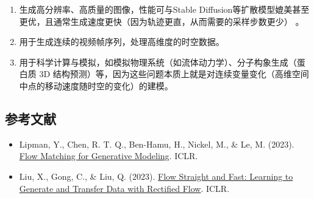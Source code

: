 \begin{enumerate}
\def\labelenumi{\arabic{enumi}.}
\item
  生成高分辨率、高质量的图像，性能可与Stable Diffusion等扩散模型媲美甚至更优，且通常生成速度更快（因为轨迹更直，从而需要的采样步数更少） 。
\item
  用于生成连续的视频帧序列，处理高维度的时空数据。
\item
  用于科学计算与模拟，如模拟物理系统（如流体动力学）、分子构象生成（蛋白质 3D 结构预测）等，因为这些问题本质上就是对连续变量变化（高维空间中点的移动速度随时空的变化）的建模。
\end{enumerate}

\FloatBarrier
{}
\hypertarget{ux53c2ux8003ux6587ux732e-135}{%
\subsection{参考文献}\label{ux53c2ux8003ux6587ux732e-135}}

\vspace{0.25em}
\begin{itemize}
\tightlist
\item
  Lipman, Y., Chen, R. T. Q., Ben-Hamu, H., Nickel, M., \& Le, M. (2023). \href{https://arxiv.org/abs/2210.02747}{Flow Matching for Generative Modeling}. ICLR.
\item
  Liu, X., Gong, C., \& Liu, Q. (2023). \href{https://arxiv.org/abs/2209.03003}{Flow Straight and Fast: Learning to Generate and Transfer Data with Rectified Flow}. ICLR.
\end{itemize}

\clearpage
